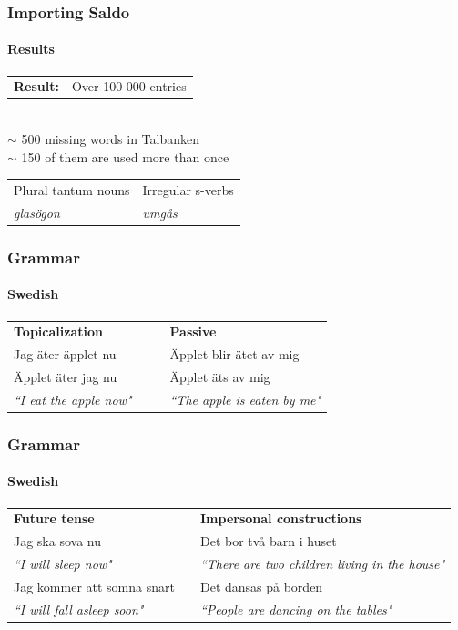 \documentclass[10pt]{beamer}
\begin{document}
\begin{frame}
\frametitle{Importing Saldo}
\framesubtitle{Results} 
\vspace{5mm}
\begin{tabular}{ll}
\textbf{Result:} & Over 100 000 entries\\
\end{tabular}\\
\vspace{4mm}
\pause
$\sim$ 500 missing words in Talbanken\\
\pause
$\sim$ 150 of them are used more than once \\
\pause
\vspace{4mm}
\begin{tabular}{ll}
Plural tantum nouns & Irregular s-verbs \\
\emph{glasögon} & \emph{umgås}\\
\end{tabular}
\end{frame}

\begin{frame}
\frametitle{Grammar}
\framesubtitle{Swedish} 
\begin{tabular}{llll}
\textbf{Topicalization}& && \textbf{Passive}\\
Jag äter äpplet nu && &Äpplet blir ätet av mig \\
Äpplet äter jag nu &&& Äpplet äts av mig \\
\emph{``I eat the apple now"}& &&\emph{``The apple is eaten by me"}\\
\end{tabular}
\end{frame}

\begin{frame}
\frametitle{Grammar}
\framesubtitle{Swedish} 
\begin{tabular}{lll}
 \textbf{Future tense}  &&\textbf{Impersonal constructions} \\
Jag ska sova nu & &Det bor två barn i huset \\
\emph{``I will sleep now"} && \emph{``There are two children living in the house"} \\
Jag kommer att somna snart &&Det dansas på borden  \\
\emph{``I will fall asleep soon"} &&\emph{``People are dancing on the tables"}  \\
\end{tabular}
\end{frame}
\end{document}
